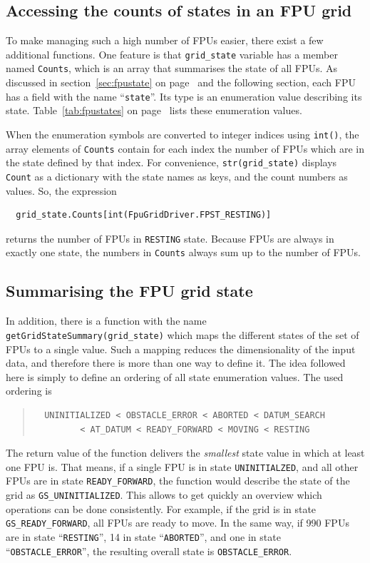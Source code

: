 \documentclass[11pt,a4paper]{scrartcl}
\begin{document}
\subsection{Accessing the counts of states in an FPU grid}
To make managing such a high number of FPUs easier, there exist a few
additional functions. One feature is that \texttt{grid\_state}
variable has a member named \texttt{Counts}, which is an array that
summarises the state of all FPUs. As discussed in
section~\ref{sec:fpustate} on page~\pageref{sec:fpustate} and the
following section, each FPU has a field with the name
``\texttt{state}''. Its type is an enumeration value describing its
state. Table~\ref{tab:fpustates} on page~\pageref{tab:fpustates} lists
these enumeration values.

When the enumeration symbols are converted to integer indices using
\texttt{int()}, the array elements of \texttt{Counts} contain for each
index the number of FPUs which are in the state defined by that
index. For convenience, \texttt{str(grid\_state)} displays
\texttt{Count} as a dictionary with the state names as keys, and the
count numbers as values. So, the expression
\begin{verbatim}
  grid_state.Counts[int(FpuGridDriver.FPST_RESTING)]
\end{verbatim}
returns the number of FPUs in \texttt{RESTING} state. Because FPUs are
always in exactly one state, the numbers in \texttt{Counts} always sum
up to the number of FPUs.

\subsection{Summarising the FPU grid state}
In addition, there is a function with the name
\texttt{getGridStateSummary(grid\_state)} which maps the different
states of the set of FPUs to a single value. Such a mapping reduces
the dimensionality of the input data, and therefore there is more than
one way to define it. The idea followed here is simply to define an
ordering of all state enumeration values. The used ordering is
\begin{quote}
\begin{verbatim}
  UNINITIALIZED < OBSTACLE_ERROR < ABORTED < DATUM_SEARCH
         < AT_DATUM < READY_FORWARD < MOVING < RESTING
\end{verbatim}
\end{quote}

The return value of the function delivers the \emph{smallest} state
value in which at least one FPU is.  That means, if a single FPU is in
state \texttt{UNINITIALZED}, and all other FPUs are in state
\texttt{READY\_FORWARD}, the function would describe the state of the
grid as \texttt{GS\_UNINITIALIZED}. This allows to get quickly an
overview which operations can be done consistently. For example, if
the grid is in state \texttt{GS\_READY\_FORWARD}, all FPUs are ready
to move. In the same way, if 990 FPUs are in state ``\texttt{RESTING}'',
14 in state ``\texttt{ABORTED}'', and one in state ``\texttt{OBSTACLE\_ERROR}'',
the resulting overall state is \texttt{OBSTACLE\_ERROR}.
\end{document}
